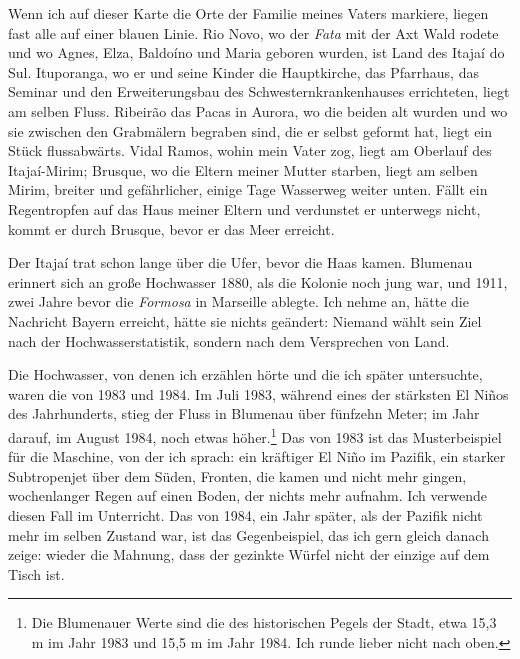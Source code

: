 \documentclass[
  ngerman,
  11pt,
  openany]{book}
\begin{document}
Wenn ich auf dieser Karte die Orte der Familie meines Vaters markiere,
liegen fast alle auf einer blauen Linie. Rio Novo, wo der \emph{Fata}
mit der Axt Wald rodete und wo Agnes, Elza, Baldoíno und Maria geboren
wurden, ist Land des Itajaí do Sul. Ituporanga, wo er und seine Kinder
die Hauptkirche, das Pfarrhaus, das Seminar und den Erweiterungsbau des
Schwesternkrankenhauses errichteten, liegt am selben Fluss. Ribeirão das
Pacas in Aurora, wo die beiden alt wurden und wo sie zwischen den
Grabmälern begraben sind, die er selbst geformt hat, liegt ein Stück
flussabwärts. Vidal Ramos, wohin mein Vater zog, liegt am Oberlauf des
Itajaí-Mirim; Brusque, wo die Eltern meiner Mutter starben, liegt am
selben Mirim, breiter und gefährlicher, einige Tage Wasserweg weiter
unten. Fällt ein Regentropfen auf das Haus meiner Eltern und verdunstet
er unterwegs nicht, kommt er durch Brusque, bevor er das Meer erreicht.

Der Itajaí trat schon lange über die Ufer, bevor die Haas kamen.
Blumenau erinnert sich an große Hochwasser 1880, als die Kolonie noch
jung war, und 1911, zwei Jahre bevor die \emph{Formosa} in Marseille
ablegte. Ich nehme an, hätte die Nachricht Bayern erreicht, hätte sie
nichts geändert: Niemand wählt sein Ziel nach der Hochwasserstatistik,
sondern nach dem Versprechen von Land.

Die Hochwasser, von denen ich erzählen hörte und die ich später
untersuchte, waren die von 1983 und 1984. Im Juli 1983, während eines
der stärksten El Niños des Jahrhunderts, stieg der Fluss in Blumenau
über fünfzehn Meter; im Jahr darauf, im August 1984, noch etwas
höher.\footnote{Die Blumenauer Werte sind die des historischen Pegels
  der Stadt, etwa 15,3 m im Jahr 1983 und 15,5 m im Jahr 1984. Ich runde
  lieber nicht nach oben.} Das von 1983 ist das Musterbeispiel für die
Maschine, von der ich sprach: ein kräftiger El Niño im Pazifik, ein
starker Subtropenjet über dem Süden, Fronten, die kamen und nicht mehr
gingen, wochenlanger Regen auf einen Boden, der nichts mehr aufnahm. Ich
verwende diesen Fall im Unterricht. Das von 1984, ein Jahr später, als
der Pazifik nicht mehr im selben Zustand war, ist das Gegenbeispiel, das
ich gern gleich danach zeige: wieder die Mahnung, dass der gezinkte
Würfel nicht der einzige auf dem Tisch ist.
\end{document}
